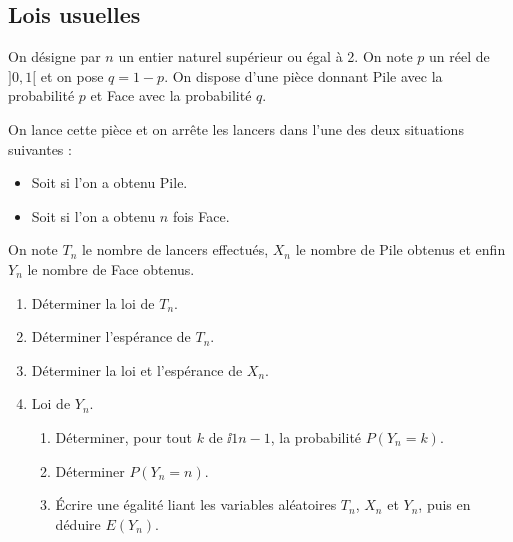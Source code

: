 \documentclass[a4paper,twoside,french,11pt]{VcCours}
\begin{document}
\subsection{Lois usuelles}


\begin{Exercice}{} On désigne par $n$ un entier naturel supérieur ou égal à 2. On note $p$ un réel de $]0,1[$ et on pose $q = 1-p$. On dispose d'une pièce donnant Pile avec la probabilité $p$ et Face avec la probabilité $q$.

On lance cette pièce et on arrête les lancers dans l'une des deux situations suivantes :
\begin{itemize}
 \item Soit si l'on a obtenu Pile.
 \item Soit si l'on a obtenu $n$ fois Face.
\end{itemize}
%

On note $T_n$ le nombre de lancers effectués, $X_n$ le nombre de Pile obtenus et enfin $Y_n$ le nombre de Face obtenus. 
\begin{enumerate}
 \item  Déterminer la loi de $T_n$.
 \item  Déterminer l'espérance de $T_n$.
 \item Déterminer la loi et l'espérance de $X_n$.
 \item Loi de $Y_n$.
 \begin{enumerate}
  \item Déterminer, pour tout $k$ de $\ii{1}{n-1}$, la probabilité $P(Y_n = k)$.
  \item Déterminer $P(Y_n = n)$.
  \item Écrire une égalité liant les variables aléatoires $T_n$, $X_n$ et $Y_n$, puis en déduire $E(Y_n)$.
\end{enumerate}
\end{enumerate}
\end{Exercice}
\end{document}
